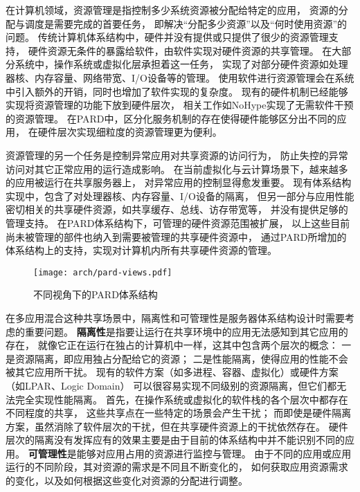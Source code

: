 在计算机领域，资源管理是指控制多少系统资源被分配给特定的应用，
资源的分配与调度是需要完成的首要任务，
即解决``分配多少资源''以及``何时使用资源''的问题。
传统计算机体系结构中，硬件并没有提供或只提供了很少的资源管理支持，
硬件资源无条件的暴露给软件，由软件实现对硬件资源的共享管理。
在大部分系统中，操作系统或虚拟化层承担着这一任务，
实现了对部分硬件资源如处理器核、内存容量、网络带宽、I/O设备等的管理。
使用软件进行资源管理会在系统中引入额外的开销\cite{}，同时也增加了软件实现的复杂度。
现有的硬件机制已经能够实现将资源管理的功能下放到硬件层次，
相关工作如NoHype\cite{}实现了无需软件干预的资源管理。
在PARD中，区分化服务机制的存在使得硬件能够区分出不同的应用，
在硬件层次实现细粒度的资源管理更为便利。



资源管理的另一个任务是控制异常应用对共享资源的访问行为，
防止失控的异常访问对其它正常应用的运行造成影响。
在当前虚拟化与云计算场景下，越来越多的应用被运行在共享服务器上，
对异常应用的控制显得愈发重要。
现有体系结构实现中，包含了对处理器核、内存容量、I/O设备的隔离，
但另一部分与应用性能密切相关的共享硬件资源，如共享缓存、总线、访存带宽等，
并没有提供足够的管理支持。
在PARD体系结构下，可管理的硬件资源范围被扩展，
以上这些目前尚未被管理的部件也纳入到需要被管理的共享硬件资源中，
通过PARD所增加的体系结构上的支持，实现对计算机内所有共享硬件资源的管理。


\begin{figure}[t]
  \centering
  \texttt{[image: arch/pard-views.pdf]}
  \caption{不同视角下的PARD体系结构}
  \label{fig:pard-views}
\end{figure}

在多应用混合这种共享场景中，隔离性和可管理性是服务器体系结构设计时需要考虑的重要问题。
\textbf{隔离性}是指要让运行在共享环境中的应用无法感知到其它应用的存在，
就像它正在运行在独占的计算机中一样，这其中包含两个层次的概念：
一是资源隔离，即应用独占分配给它的资源；
二是性能隔离，使得应用的性能不会被其它应用所干扰。
现有的软件方案（如多进程、容器、虚拟化）或硬件方案（如LPAR、Logic Domain）
可以很容易实现不同级别的资源隔离，但它们都无法完全实现性能隔离。
首先，在操作系统或虚拟化的软件栈的各个层次中都存在不同程度的共享，
这些共享点在一些特定的场景会产生干扰；
而即使是硬件隔离方案，虽然消除了软件层次的干扰，但在共享硬件资源上的干扰依然存在。
硬件层次的隔离没有发挥应有的效果主要是由于目前的体系结构中并不能识别不同的应用。
\textbf{可管理性}是能够对应用占用的资源进行监控与管理。
由于不同的应用或应用运行的不同阶段，其对资源的需求是不同且不断变化的，
如何获取应用资源需求的变化，以及如何根据这些变化对资源的分配进行调整。

